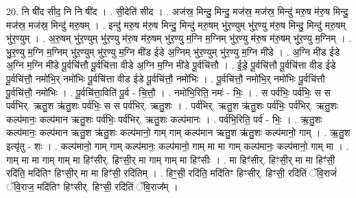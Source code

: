 \documentclass[17pt]{extarticle}
\begin{document}
20. नि षी॑द सीद॒ नि नि षी॑द । . सी॒देति॑ सीद । . अज॑स्र॒ मिन्दु॒ मिन्दु॒ मज॑स्र॒ मज॑स्र॒ मिन्दु॑ मरु॒ष म॑रु॒ष मिन्दु॒ मज॑स्र॒ मज॑स्र॒ मिन्दु॑ मरु॒षम् । . इन्दु॑ मरु॒ष म॑रु॒ष मिन्दु॒ मिन्दु॑ मरु॒षम् भु॑र॒ण्युम् भु॑र॒ण्यु म॑रु॒ष मिन्दु॒ मिन्दु॑ मरु॒षम् भु॑र॒ण्युम् । . अ॒रु॒षम् भु॑र॒ण्युम् भु॑र॒ण्यु म॑रु॒ष म॑रु॒षम् भु॑र॒ण्यु म॒ग्नि म॒ग्निम् भु॑र॒ण्यु म॑रु॒ष म॑रु॒षम् भु॑र॒ण्यु म॒ग्निम् । . भु॒र॒ण्यु म॒ग्नि म॒ग्निम् भु॑र॒ण्युम् भु॑र॒ण्यु म॒ग्नि मी॑ड ईडे अ॒ग्निम् भु॑र॒ण्युम् भु॑र॒ण्यु म॒ग्नि मी॑डे । . अ॒ग्नि मी॑ड ईडे अ॒ग्नि म॒ग्नि मी॑डे पू॒र्वचि॑त्तौ पू॒र्वचि॑त्ता वीडे अ॒ग्नि म॒ग्नि मी॑डे पू॒र्वचि॑त्तौ । . ई॒डे॒ पू॒र्वचि॑त्तौ पू॒र्वचि॑त्ता वीड ईडे पू॒र्वचि॑त्तौ॒ नमो॑भि॒र् नमो॑भिः पू॒र्वचि॑त्ता वीड ईडे पू॒र्वचि॑त्तौ॒ नमो॑भिः । . पू॒र्वचि॑त्तौ॒ नमो॑भि॒र् नमो॑भिः पू॒र्वचि॑त्तौ पू॒र्वचि॑त्तौ॒ नमो॑भिः । . पू॒र्वचि॑त्ता॒विति॑ पू॒र्व - चि॒त्तौ॒ । . नमो॑भि॒रिति॒ नमः॑ - भिः॒ । . स पर्व॑भिः॒ पर्व॑भिः॒ स स पर्व॑भिर्. ऋतु॒श ऋ॑तु॒शः पर्व॑भिः॒ स स पर्व॑भिर्. ऋतु॒शः । . पर्व॑भिर्. ऋतु॒श ऋ॑तु॒शः पर्व॑भिः॒ पर्व॑भिर्. ऋतु॒शः कल्प॑मानः॒ कल्प॑मान ऋतु॒शः पर्व॑भिः॒ पर्व॑भिर्. ऋतु॒शः कल्प॑मानः । . पर्व॑भि॒रिति॒ पर्व॑ - भिः॒ । . ऋ॒तु॒शः कल्प॑मानः॒ कल्प॑मान ऋतु॒श ऋ॑तु॒शः कल्प॑मानो॒ गाम् गाम् कल्प॑मान ऋतु॒श ऋ॑तु॒शः कल्प॑मानो॒ गाम् । . ऋ॒तु॒श इत्यृ॑तु - शः । . कल्प॑मानो॒ गाम् गाम् कल्प॑मानः॒ कल्प॑मानो॒ गाम् मा मा गाम् कल्प॑मानः॒ कल्प॑मानो॒ गाम् मा । . गाम् मा मा गाम् गाम् मा हिꣳ॑सीर्. हिꣳसी॒र् मा गाम् गाम् मा हिꣳ॑सीः । . मा हिꣳ॑सीर्. हिꣳसी॒र् मा मा हिꣳ॑सी॒ रदि॑ति॒ मदि॑तिꣳ हिꣳसी॒र् मा मा हिꣳ॑सी॒ रदि॑तिम् । . हिꣳ॒॒सी॒ रदि॑ति॒ मदि॑तिꣳ हिꣳसीर्. हिꣳसी॒ रदि॑तिं ॅवि॒राजं॑ ॅवि॒राज॒ मदि॑तिꣳ हिꣳसीर्. हिꣳसी॒ रदि॑तिं ॅवि॒राज᳚म् । \newline
\end{document}
